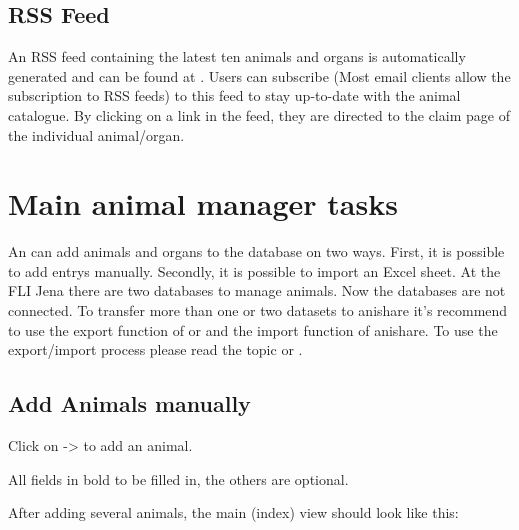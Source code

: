 \documentclass[letterpaper,10pt,openany,oneside,english]{sphinxmanual}
\begin{document}
\noindent{}


\subsection{RSS Feed}
\label{\detokenize{index:rss-feed}}
An RSS feed containing the latest ten animals and organs is automatically generated and can be found at
. Users can subscribe (Most email clients allow the subscription
to RSS feeds) to this feed to stay up-to-date with the animal catalogue. By clicking on a link in
the feed, they are directed to the claim page of the individual animal/organ.

\noindent{}


\section{Main animal manager tasks}
\label{\detokenize{index:main-animal-manager-tasks}}
An  can add animals and organs to the database on two ways. First, it is possible to
add entrys manually. Secondly, it is possible to import an Excel sheet. At the FLI Jena there are two
databases to manage animals. Now the databases are not connected. To transfer more than one or two datasets
to anishare it’s recommend to use the export function of  or  and the import function of anishare.
To use the export/import process please read the topic  or .

\noindent{}


\subsection{Add Animals manually}
\label{\detokenize{index:add-animals-manually}}
Click on  -\textgreater{}  to add an animal.

\noindent{}

All fields in bold  to be filled in, the others are optional.

After adding several animals, the main (index) view should look like this:
\end{document}
